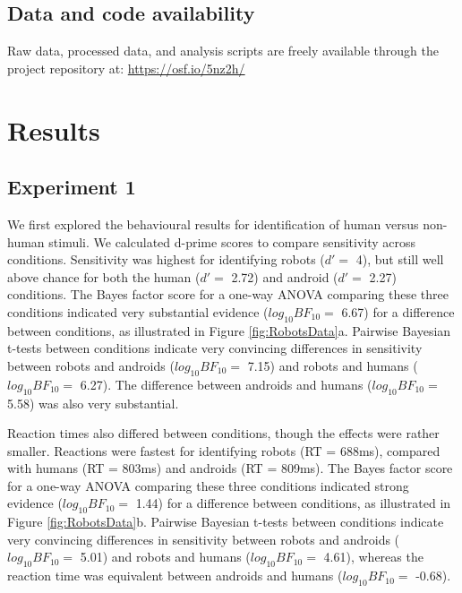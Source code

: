 \documentclass[
]{article}
\begin{document}
\hypertarget{data-and-code-availability}{%
\subsection{Data and code availability}\label{data-and-code-availability}}

Raw data, processed data, and analysis scripts are freely available through the project repository at: \url{https://osf.io/5nz2h/}

\hypertarget{results}{%
\section{Results}\label{results}}

\hypertarget{experiment-1}{%
\subsection{Experiment 1}\label{experiment-1}}

We first explored the behavioural results for identification of human versus non-human stimuli. We calculated d-prime scores to compare sensitivity across conditions. Sensitivity was highest for identifying robots (\(d' =\) 4), but still well above chance for both the human (\(d' =\) 2.72) and android (\(d' =\) 2.27) conditions. The Bayes factor score for a one-way ANOVA comparing these three conditions indicated very substantial evidence (\(log_{10}BF_{10} =\) 6.67) for a difference between conditions, as illustrated in Figure \ref{fig:RobotsData}a. Pairwise Bayesian t-tests between conditions indicate very convincing differences in sensitivity between robots and androids (\(log_{10}BF_{10} =\) 7.15) and robots and humans (\(log_{10}BF_{10} =\) 6.27). The difference between androids and humans (\(log_{10}BF_{10} =\) 5.58) was also very substantial.

Reaction times also differed between conditions, though the effects were rather smaller. Reactions were fastest for identifying robots (RT = 688ms), compared with humans (RT = 803ms) and androids (RT = 809ms). The Bayes factor score for a one-way ANOVA comparing these three conditions indicated strong evidence (\(log_{10}BF_{10} =\) 1.44) for a difference between conditions, as illustrated in Figure \ref{fig:RobotsData}b. Pairwise Bayesian t-tests between conditions indicate very convincing differences in sensitivity between robots and androids (\(log_{10}BF_{10} =\) 5.01) and robots and humans (\(log_{10}BF_{10} =\) 4.61), whereas the reaction time was equivalent between androids and humans (\(log_{10}BF_{10} =\) -0.68).
\end{document}
